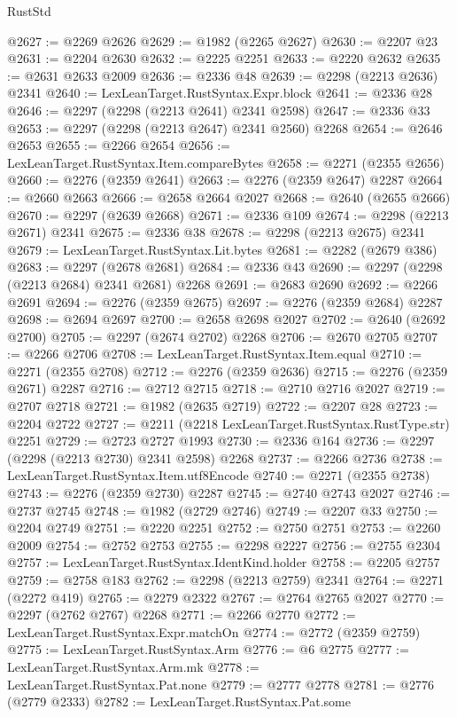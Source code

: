 \begin{lexlean}{RustStd}
\begin{coremodule}
@2627 := @2269 @2626
@2629 := @1982 (@2265 @2627)
@2630 := @2207 @23
@2631 := @2204 @2630
@2632 := @2225 @2251
@2633 := @2220 @2632
@2635 := @2631 @2633 @2009
@2636 := @2336 @48
@2639 := @2298 (@2213 @2636) @2341
@2640 := LexLeanTarget.RustSyntax.Expr.block
@2641 := @2336 @28
@2646 := @2297 (@2298 (@2213 @2641) @2341 @2598)
@2647 := @2336 @33
@2653 := @2297 (@2298 (@2213 @2647) @2341 @2560) @2268
@2654 := @2646 @2653
@2655 := @2266 @2654
@2656 := LexLeanTarget.RustSyntax.Item.compareBytes
@2658 := @2271 (@2355 @2656)
@2660 := @2276 (@2359 @2641)
@2663 := @2276 (@2359 @2647) @2287
@2664 := @2660 @2663
@2666 := @2658 @2664 @2027
@2668 := @2640 (@2655 @2666)
@2670 := @2297 (@2639 @2668)
@2671 := @2336 @109
@2674 := @2298 (@2213 @2671) @2341
@2675 := @2336 @38
@2678 := @2298 (@2213 @2675) @2341
@2679 := LexLeanTarget.RustSyntax.Lit.bytes
@2681 := @2282 (@2679 @386)
@2683 := @2297 (@2678 @2681)
@2684 := @2336 @43
@2690 := @2297 (@2298 (@2213 @2684) @2341 @2681) @2268
@2691 := @2683 @2690
@2692 := @2266 @2691
@2694 := @2276 (@2359 @2675)
@2697 := @2276 (@2359 @2684) @2287
@2698 := @2694 @2697
@2700 := @2658 @2698 @2027
@2702 := @2640 (@2692 @2700)
@2705 := @2297 (@2674 @2702) @2268
@2706 := @2670 @2705
@2707 := @2266 @2706
@2708 := LexLeanTarget.RustSyntax.Item.equal
@2710 := @2271 (@2355 @2708)
@2712 := @2276 (@2359 @2636)
@2715 := @2276 (@2359 @2671) @2287
@2716 := @2712 @2715
@2718 := @2710 @2716 @2027
@2719 := @2707 @2718
@2721 := @1982 (@2635 @2719)
@2722 := @2207 @28
@2723 := @2204 @2722
@2727 := @2211 (@2218 LexLeanTarget.RustSyntax.RustType.str) @2251
@2729 := @2723 @2727 @1993
@2730 := @2336 @164
@2736 := @2297 (@2298 (@2213 @2730) @2341 @2598) @2268
@2737 := @2266 @2736
@2738 := LexLeanTarget.RustSyntax.Item.utf8Encode
@2740 := @2271 (@2355 @2738)
@2743 := @2276 (@2359 @2730) @2287
@2745 := @2740 @2743 @2027
@2746 := @2737 @2745
@2748 := @1982 (@2729 @2746)
@2749 := @2207 @33
@2750 := @2204 @2749
@2751 := @2220 @2251
@2752 := @2750 @2751
@2753 := @2260 @2009
@2754 := @2752 @2753
@2755 := @2298 @2227
@2756 := @2755 @2304
@2757 := LexLeanTarget.RustSyntax.IdentKind.holder
@2758 := @2205 @2757
@2759 := @2758 @183
@2762 := @2298 (@2213 @2759) @2341
@2764 := @2271 (@2272 @419)
@2765 := @2279 @2322
@2767 := @2764 @2765 @2027
@2770 := @2297 (@2762 @2767) @2268
@2771 := @2266 @2770
@2772 := LexLeanTarget.RustSyntax.Expr.matchOn
@2774 := @2772 (@2359 @2759)
@2775 := LexLeanTarget.RustSyntax.Arm
@2776 := @6 @2775
@2777 := LexLeanTarget.RustSyntax.Arm.mk
@2778 := LexLeanTarget.RustSyntax.Pat.none
@2779 := @2777 @2778
@2781 := @2776 (@2779 @2333)
@2782 := LexLeanTarget.RustSyntax.Pat.some

\end{coremodule}
\end{lexlean}
